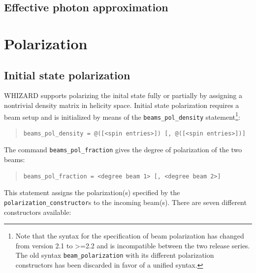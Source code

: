 \documentclass[12pt]{book}
\newcommand{\ttt}[1]{\texttt{#1}}
\begin{document}
\subsection{Effective photon approximation}

\section{Polarization}
\label{sec:polarization}


\subsection{Initial state polarization}
\label{sec:initialpolarization}

WHIZARD supports polarizing the inital state fully or partially by
assigning a nontrivial density matrix in helicity space. 
Initial state polarization requires a beam setup and is initialized by
means of the \ttt{beams\_pol\_density} statement\footnote{Note that
  the syntax for the specification of beam polarization has changed
  from version 2.1 to >=2.2 and is incompatible between the two release
  series. The old syntax \ttt{beam\_polarization} with its different
  polarization constructors has been discarded in favor of a unified
  syntax.}:
\begin{quote}
\begin{footnotesize}
\begin{verbatim}
beams_pol_density = @([<spin entries>]) [, @([<spin entries>])]
\end{verbatim}
\end{footnotesize}
\end{quote}
The command \ttt{beams\_pol\_fraction} gives the degree of
polarization of the two beams:
\begin{quote}
\begin{footnotesize}
\begin{verbatim}
beams_pol_fraction = <degree beam 1> [, <degree beam 2>]
\end{verbatim}
\end{footnotesize}
\end{quote}
This statement assigns the polarization(s) specified by the
\ttt{polarization\_constructor}s to the incoming beam(s). There are seven
different constructors available:
%
\end{document}
